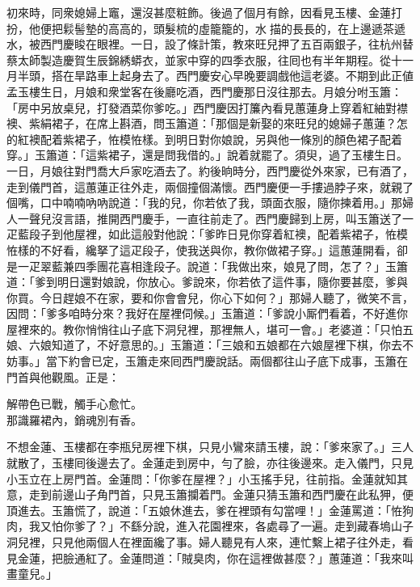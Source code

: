 初來時，同衆媳婦上竈，還沒甚麼粧飾。後過了個月有餘，因看見玉樓、金蓮打扮，他便把鬏髻墊的高高的，頭髮梳的虛籠籠的，水𩬆描的長長的，{}在上邊遞茶遞水，被西門慶睃在眼裡。{}一日，設了條計策，教來旺兒押了五百兩銀子，往杭州替蔡太師製造慶賀生辰錦綉蟒衣，並家中穿的四季衣服，往囘也有半年期程。從十一月半頭，搭在旱路車上起身去了。西門慶安心早晚要調戲他這老婆。不期到此正値孟玉樓生日，月娘和衆堂客在後廳吃酒，西門慶那日沒往那去。月娘分咐玉簫：「房中另放桌兒，打發酒菜你爹吃。」西門慶因打簾內看見蕙蓮身上穿着紅紬對襟襖、紫絹裙子，在席上斟酒，問玉簫道：「那個是新娶的來旺兒的媳婦子蕙蓮？怎的紅襖配着紫裙子，恠模恠樣。{}到明日對你娘說，另與他一條別的顏色裙子配着穿。」玉簫道：「這紫裙子，還是問我借的。」說着就罷了。須臾，過了玉樓生日。一日，月娘往對門喬大戶家吃酒去了。約後晌時分，西門慶從外來家，已有酒了，走到儀門首，這蕙蓮正往外走，兩個撞個滿懷。西門慶便一手摟過脖子來，就親了個嘴，口中喃喃吶吶說道：「我的兒，你若依了我，頭面衣服，隨你揀着用。」{}那婦人一聲兒沒言語，推開西門慶手，一直往前走了。西門慶歸到上房，叫玉簫送了一疋藍段子到他屋裡，如此這般對他說：「爹昨日見你穿着紅襖，配着紫裙子，恠模恠樣的不好看，纔拏了這疋段子，使我送與你，教你做裙子穿。」這蕙蓮開看，卻是一疋翠藍兼四季團花喜相逢段子。說道：「我做出來，娘見了問，怎了？」玉簫道：「爹到明日還對娘說，你放心。爹說來，你若依了這件事，隨你要甚麼，爹與你買。今日趕娘不在家，要和你會會兒，你心下如何？」那婦人聽了，微笑不言，因問：「爹多咱時分來？我好在屋裡伺候。」玉簫道：「爹說小厮們看着，不好進你屋裡來的。教你悄悄往山子底下洞兒裡，那裡無人，堪可一會。」老婆道：「只怕五娘、六娘知道了，不好意思的。」玉簫道：「三娘和五娘都在六娘屋裡下棋，你去不妨事。」當下約會已定，玉簫走來囘西門慶說話。兩個都往山子底下成事，玉簫在門首與他觀風。正是：

\begin{myquote} 
解帶色已戰，{}觸手心愈忙。\\
那識羅裙內，銷魂別有香。
\end{myquote} 

不想金蓮、玉樓都在李瓶兒房裡下棋，只見小鸞來請玉樓，說：「爹來家了。」三人就散了，玉樓囘後邊去了。金蓮走到房中，勻了臉，{}亦往後邊來。走入儀門，只見小玉立在上房門首。金蓮問：「你爹在屋裡？」小玉搖手兒，往前指。{}金蓮就知其意，走到前邊山子角門首，只見玉簫攔着門。金蓮只猜玉簫和西門慶在此私狎，便頂進去。玉簫慌了，說道：「五娘休進去，爹在裡頭有勾當哩！」金蓮罵道：「恠狗肉，我又怕你爹了？」不繇分說，進入花園裡來，各處尋了一遍。走到藏春塢山子洞兒裡，只見他兩個人在裡面纔了事。婦人聽見有人來，連忙繫上裙子往外走，看見金蓮，把臉通紅了。金蓮問道：「賊臭肉，你在這裡做甚麼？」蕙蓮道：「我來叫畫童兒。」

